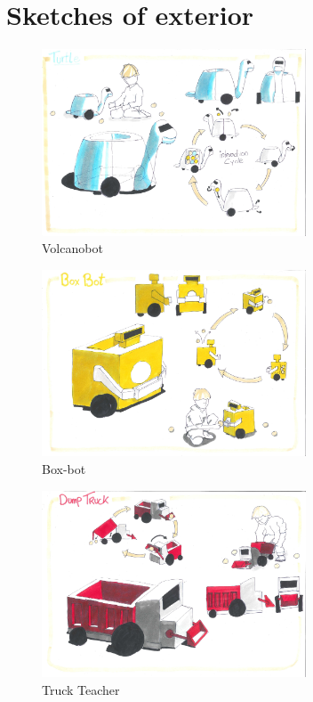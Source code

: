 \documentclass[11pt,twoside,a4paper]{report}
\begin{document}
\section{Sketches of exterior}
\begin{figure}[H]
  \begin{center}
    \includegraphics[width=0.70\textwidth]{Images/VolcanoBotConcept.pdf}
  \end{center}
  \caption{Volcanobot}
  \label{figure:volcanobot2}
\end{figure}
\begin{figure}
  \begin{center}
    \includegraphics[width=0.70\textwidth]{Images/BoxBotConcept.pdf}
  \end{center}
  \caption{Box-bot}
  \label{figure:boxbot2}
\end{figure}
\begin{figure}
  \begin{center}
    \includegraphics[width=0.70\textwidth]{Images/TruckTeacherConcept.pdf}
  \end{center}
  \caption{Truck Teacher}
  \label{figure:truckteacher2}
\end{figure}
\label{sect:conceptsketches}
\end{document}

